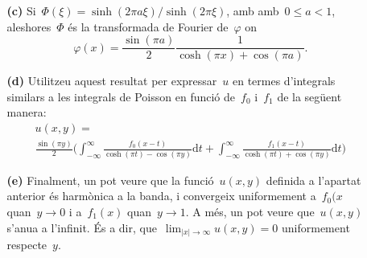 \documentclass[a4paper]{article}
\theoremstyle{plain}
\theoremstyle{definition}
\providecommand{\uppi}{\pi}
\newcommand{\diff}{\mathrm{d}}
\newcommand{\abs}[1]{\lvert{#1}\rvert}
\begin{document}
\begin{enumerate}
    \item[]\begin{enumerate}
        \item[\textbf{(c)}] Si~\(\Phi(\xi)=\sinh(2\uppi a\xi)/\sinh(2\uppi\xi)\), amb
            amb~\(0\leq a<1\), aleshores~\(\Phi\) és la transformada de Fourier
            de~\(\varphi\) on
            \[
                \varphi(x)
                = \frac{\sin(\uppi a)}{2}
                \frac{1}{\cosh(\uppi x) + \cos(\uppi a)}.
            \]
    \end{enumerate}
\end{enumerate}

\begin{enumerate}
    \item[]\begin{enumerate}
        \item[\textbf{(d)}] Utilitzeu aquest resultat per expressar~\(u\) en
            termes d'integrals similars a les integrals de Poisson en funció
            de~\(f_{0}\) i~\(f_{1}\) de la següent manera:
            \begin{multline*}
                u(x,y)
                = \\
                \frac{\sin(\uppi y)}{2}
                \biggl(
                    \int_{-\infty}^{\infty}
                    \frac{f_{0}(x-t)}{\cosh(\uppi t)-\cos(\uppi y)}
                    \diff t
                    +
                    \int_{-\infty}^{\infty}
                    \frac{f_{1}(x-t)}{\cosh(\uppi t)+\cos(\uppi y)}
                    \diff t
                \biggr)
            \end{multline*}
    \end{enumerate}
\end{enumerate}

\begin{enumerate}
    \item[]\begin{enumerate}
        \item[\textbf{(e)}] Finalment, un pot veure que la funció~\(u(x,y)\)
            definida a l'apartat anterior és harmònica a la banda, i convergeix
            uniformement a~\(f_{0}(x\) quan~\(y\to0\) i a~\(f_{1}(x)\)
            quan~\(y\to1\).
            A més, un pot veure que~\(u(x,y)\) s'anu{\lgem}a a l'infinit. És a
            dir, que~\(\lim_{\abs{x}\to\infty}u(x,y)=0\) uniformement
            respecte~\(y\).
    \end{enumerate}
\end{enumerate}
\end{document}
